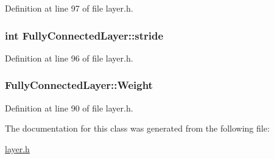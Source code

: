 Definition at line 97 of file layer.\+h.

\hypertarget{class_fully_connected_layer_a35d64d38efc0d0be3f79b8f82835579c}{
\subsubsection[{stride}]{\setlength{\rightskip}{0pt plus 5cm}int Fully\+Connected\+Layer\+::stride}}\label{class_fully_connected_layer_a35d64d38efc0d0be3f79b8f82835579c}


Definition at line 96 of file layer.\+h.

\hypertarget{class_fully_connected_layer_a3cf0cc240abfd47b8ce17c0f9886612b}{
\subsubsection[{Weight}]{ Fully\+Connected\+Layer\+::\+Weight}}\label{class_fully_connected_layer_a3cf0cc240abfd47b8ce17c0f9886612b}


Definition at line 90 of file layer.\+h.



The documentation for this class was generated from the following file\+:\begin{DoxyCompactItemize}
\item 
\hyperlink{layer_8h}{layer.\+h}\end{DoxyCompactItemize}

